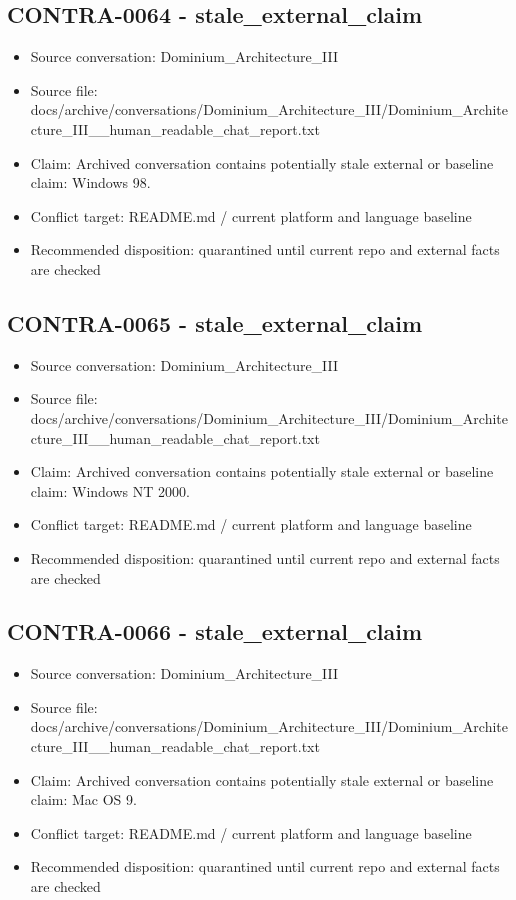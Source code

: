\documentclass[11pt,a4paper]{report}
\begin{document}
\subsection{CONTRA-0064 - stale\_external\_claim}

\begin{itemize}
\item Source conversation: Dominium\_Architecture\_III
\item Source file: docs/archive/conversations/Dominium\_Architecture\_III/Dominium\_Architecture\_III\_\_human\_readable\_chat\_report.txt
\item Claim: Archived conversation contains potentially stale external or baseline claim: Windows 98.
\item Conflict target: README.md / current platform and language baseline
\item Recommended disposition: quarantined until current repo and external facts are checked
\end{itemize}

\subsection{CONTRA-0065 - stale\_external\_claim}

\begin{itemize}
\item Source conversation: Dominium\_Architecture\_III
\item Source file: docs/archive/conversations/Dominium\_Architecture\_III/Dominium\_Architecture\_III\_\_human\_readable\_chat\_report.txt
\item Claim: Archived conversation contains potentially stale external or baseline claim: Windows NT 2000.
\item Conflict target: README.md / current platform and language baseline
\item Recommended disposition: quarantined until current repo and external facts are checked
\end{itemize}

\subsection{CONTRA-0066 - stale\_external\_claim}

\begin{itemize}
\item Source conversation: Dominium\_Architecture\_III
\item Source file: docs/archive/conversations/Dominium\_Architecture\_III/Dominium\_Architecture\_III\_\_human\_readable\_chat\_report.txt
\item Claim: Archived conversation contains potentially stale external or baseline claim: Mac OS 9.
\item Conflict target: README.md / current platform and language baseline
\item Recommended disposition: quarantined until current repo and external facts are checked
\end{itemize}
\end{document}
